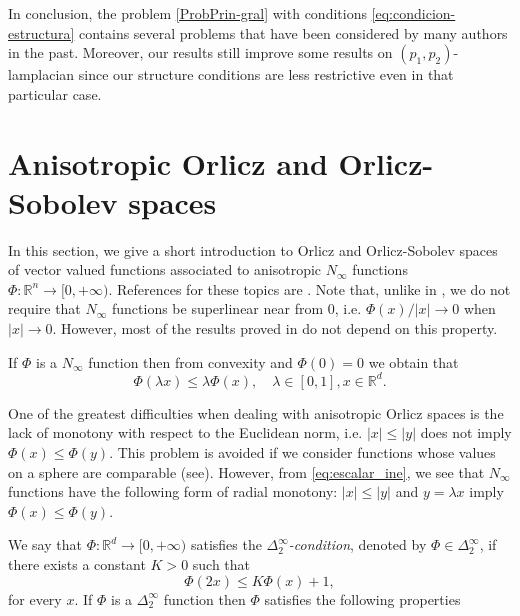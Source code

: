 \documentclass[twoside]{article}
\theoremstyle{remark}
\newcommand{\rr}{\mathbb{R}}
\renewcommand{\leq}{\leqslant}
\begin{document}
In conclusion, the problem \eqref{ProbPrin-gral} with conditions \eqref{eq:condicion-estructura}  contains several problems that have been considered by many authors in the past. 
Moreover, our results still improve some results on $(p_1,p_2)$-lamplacian since our structure conditions are less restrictive even in that particular case. 

\section{Anisotropic Orlicz and Orlicz-Sobolev spaces}\label{preliminares}

In this section, we give a short introduction to  Orlicz and Orlicz-Sobolev spaces of vector valued functions associated to anisotropic $N_{\infty}$ functions $\Phi:\rr^n\to[0,+\infty)$.  References for  these topics are \cite{Desch2001,Orliczvectorial2005,Skaff1969,cianchi2000fully,cianchi2004optimal,chamra2017anisotropic,trudinger1974imbedding,gwiazda2013anisotropic}.
Note that, unlike in \cite{gwiazda2013anisotropic}, we do not require that $N_{\infty}$ functions be superlinear near from 0, i.e. $\Phi(x)/|x|\to 0$ when $|x|\to 0$. However, most of the results proved in \cite{gwiazda2013anisotropic} do not depend on this property.

If $\Phi$  is a $N_{\infty}$ function then from convexity and $\Phi(0)=0$ we obtain that
\begin{equation}\label{eq:escalar_ine}
 \Phi(\lambda x)\leq \lambda\Phi(x),\quad \lambda\in[0,1],x\in\rr^d.
\end{equation}

One of the greatest difficulties when dealing with anisotropic Orlicz spaces is the lack of  monotony  with respect to the Euclidean norm, i.e. $|x|\leq |y|$ does not imply $\Phi(x)\leq\Phi(y)$. This problem is avoided if we consider functions whose values on a sphere are comparable (see\cite{Skaff1969}). However, from \eqref{eq:escalar_ine}, we see that  $N_{\infty}$ functions have the following form of radial monotony: $|x|\leq |y|$ and $y=\lambda x$ imply $\Phi(x)\leq\Phi(y)$. 

We say that  $\Phi:\mathbb{R}^d\rightarrow [0,+\infty)$ satisfies the  \emph{$\Delta_2^{\infty}$-condition}, denoted by $\Phi \in \Delta_2^{\infty}$,
if there exists a  constant $K>0$  such that
\begin{equation}\label{delta2defi}\Phi(2x)\leq K \Phi(x)+1,
\end{equation}
for every $x$.  
If $\Phi$ is a $\Delta_2^{\infty}$ function then $\Phi$ satisfies the following properties
\end{document}
